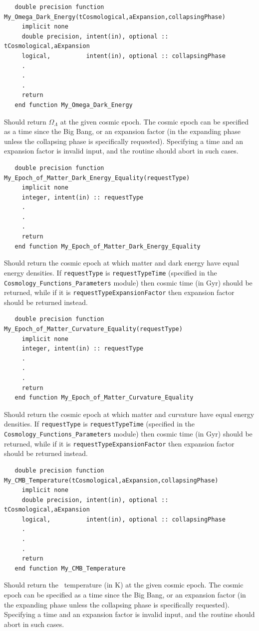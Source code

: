 \begin{verbatim}
   double precision function My_Omega_Dark_Energy(tCosmological,aExpansion,collapsingPhase)
     implicit none
     double precision, intent(in), optional :: tCosmological,aExpansion
     logical,          intent(in), optional :: collapsingPhase
     .
     .
     .
     return
   end function My_Omega_Dark_Energy
\end{verbatim}
Should return $\Omega_\Lambda$ at the given cosmic epoch. The cosmic epoch can be specified as a time since the Big Bang, or an expansion factor (in the expanding phase unless the collapsing phase is specifically requested). Specifying a time and an expansion factor is invalid input, and the routine should abort in such cases.

\begin{verbatim}
   double precision function My_Epoch_of_Matter_Dark_Energy_Equality(requestType)
     implicit none
     integer, intent(in) :: requestType
     .
     .
     .
     return
   end function My_Epoch_of_Matter_Dark_Energy_Equality
\end{verbatim}
Should return the cosmic epoch at which matter and dark energy have equal energy densities. If {\tt requestType} is {\tt requestTypeTime} (specified in the {\tt Cosmology\_Functions\_Parameters} module) then cosmic time (in Gyr) should be returned, while if it is {\tt requestTypeExpansionFactor} then expansion factor should be returned instead.

\begin{verbatim}
   double precision function My_Epoch_of_Matter_Curvature_Equality(requestType)
     implicit none
     integer, intent(in) :: requestType
     .
     .
     .
     return
   end function My_Epoch_of_Matter_Curvature_Equality
\end{verbatim}
Should return the cosmic epoch at which matter and curvature have equal energy densities. If {\tt requestType} is {\tt requestTypeTime} (specified in the {\tt Cosmology\_Functions\_Parameters} module) then cosmic time (in Gyr) should be returned, while if it is {\tt requestTypeExpansionFactor} then expansion factor should be returned instead.

\begin{verbatim}
   double precision function My_CMB_Temperature(tCosmological,aExpansion,collapsingPhase)
     implicit none
     double precision, intent(in), optional :: tCosmological,aExpansion
     logical,          intent(in), optional :: collapsingPhase
     .
     .
     .
     return
   end function My_CMB_Temperature
\end{verbatim}
Should return the \CMB\ temperature (in K) at the given cosmic epoch. The cosmic epoch can be specified as a time since the Big Bang, or an expansion factor (in the expanding phase unless the collapsing phase is specifically requested). Specifying a time and an expansion factor is invalid input, and the routine should abort in such cases.

